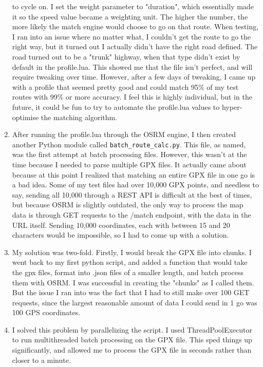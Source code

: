 \documentclass[11pt,a4paper]{report}
\begin{document}
\begin{enumerate}
	      to cycle on. I set the weight parameter to "duration", which essentially made it so the speed value became a weighting unit. The higher the number, the more likely the match engine would choose to go
	      on that route. When testing, I ran into an issue where no matter what, I couldn't get the route to go the right way, but it turned out I actually didn't have the right road defined. The road turned out
	      to be a "trunk" highway, when that type didn't exist by default in the profile.lua. This showed me that the file isn't perfect, and will require tweaking over time. However, after a few days of tweaking,
	      I came up with a profile that seemed pretty good and could match 95\% of my test routes with 99\% or more accuracy. I feel this is highly individual, but in the future, it could be fun to try to automate
	      the profile.lua values to hyper-optimise the matching algorithm.
	\item After running the profile.lua through the OSRM engine, I then created another Python module called \texttt{batch\_route\_calc.py}. This file, as named, was the first attempt
	      at batch processing files. However, this wasn't at the time because I needed to parse multiple GPX files. It actually came about because at this point I realized that matching an entire GPX file
	      in one go is a bad idea. Some of my test files had over 10,000 GPX points, and needless to say, sending all 10,000 through a REST API is difficult at the best of times, but because OSRM is slightly outdated,
	      the only way to process the map data is through GET requests to the /match endpoint, with the data in the URL itself. Sending 10,000 coordinates, each with between 15 and 20 characters would be impossible, so I had to come up with a solution.
	\item My solution was two-fold. Firstly, I would break the GPX file into chunks. I went back to my first python script, and added a function that would take the gpx files, format into .json files of a smaller length, and batch process them with OSRM.
	      I was successful in creating the "chunks" as I called them. But the issue I ran into was the fact that I had to still make over 100 GET requests, since the largest reasonable amount of data I could send in 1 go was 100 GPS coordinates.
	\item I solved this problem by parallelizing the script. I used ThreadPoolExecutor to run multithreaded batch processing on the GPX file. This sped things up significantly, and allowed me to process the GPX file in seconds rather than closer to a minute.

\end{enumerate}
\end{document}
